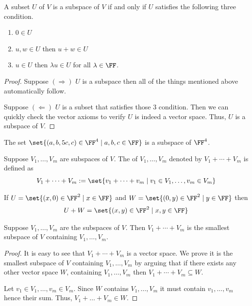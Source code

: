 \begin{theorem}
    \label{thm:subgroup criterion}
    A subset $U$ of $V$ is a subspace of $V$ if and only if $U$ satisfies the following three condition.
    \begin{enumerate}
        \item $0 \in U$
        \item $u,w \in U$ then $u+w \in U$
        \item $u \in U$ then $\lambda u \in U$ for all $\lambda \in \FF$.
    \end{enumerate}
\end{theorem}
\begin{proof}
    Suppose $(\Rightarrow)$ $U$ is a subspace then all of the things mentioned above automatically follow.
    
    Suppose $(\Leftarrow)$ $U$ is a subset that satisfies those $3$ condition. Then we can quickly check the vector axioms to verify
    $U$ is indeed a vector space. Thus, $U$ is a subspace of $V$.
\end{proof}

\begin{example}
    The set $\set{(a,b,5c,c) \in \FF^4 \mid a,b,c \in \FF}$ is a subspace of $\FF^4$.
\end{example}
\begin{definition}
    Suppose $V_1,\ldots,V_m$ are subspaces of $V$. The  of $V_1,\ldots, V_m$ denoted by $V_1+\cdots+V_m$ is 
    defined as
    \[ V_1 + \cdots + V_m := \set{v_1 + \cdots + v_m \mid v_1 \in V_1,\ldots,v_m \in V_m} \] 
\end{definition}

\begin{example}
    If $U = \set{(x,0) \in \FF^2 \mid x \in \FF }$ and $W=\set{(0,y) \in \FF^2 \mid y \in \FF}$ then
    \[ U+W = \set{(x,y) \in \FF^2 \mid x,y \in \FF} \]
\end{example}

\begin{theorem}
    \label{thm:direct sum is the smallest subspace}
    Suppose $V_1,\ldots,V_m$ are the subspaces of $V$. Then $V_1 + \cdots + V_m$ is the smallest subspace of $V$ containing 
    $V_1,\ldots,V_m$.
\end{theorem}

\begin{proof}
    It is easy to see that $V_1 + \cdots + V_m$ is a vector space. We prove it is the smallest subspace of $V$ containing $V_1,\ldots,V_m$
    by arguing that if there exists any other vector space $W$, containing $V_1,\ldots,V_m$ then $V_1+\cdots + V_m \subseteq W$. 

    Let $v_1 \in V_1,\ldots,v_m \in V_m$. Since $W$ contains $V_1,\ldots,V_m$ it must contain $v_1,\ldots,v_m$ hence their sum.
    Thus, $V_1+\ldots+V_m \in W$.
\end{proof}

